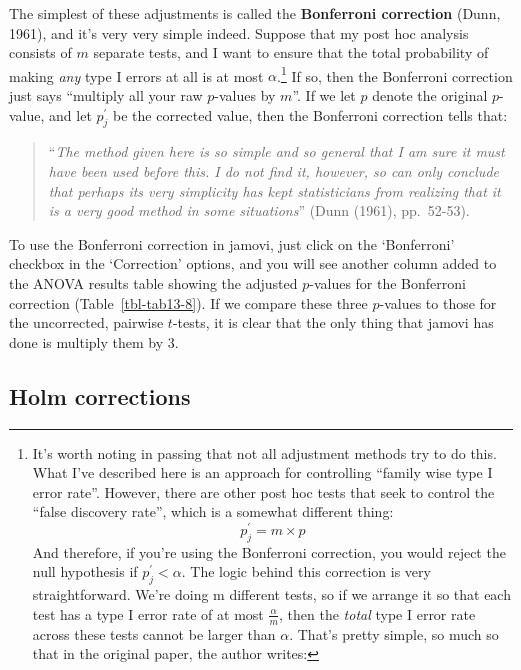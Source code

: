 \documentclass[
  a4paper,
]{book}
\begin{document}
The simplest of these adjustments is called the \textbf{Bonferroni
correction} (Dunn, 1961), and it's very very simple indeed. Suppose that
my post hoc analysis consists of \(m\) separate tests, and I want to
ensure that the total probability of making \emph{any} type I errors at
all is at most \(\alpha\).\footnote{It's worth noting in passing that
  not all adjustment methods try to do this. What I've described here is
  an approach for controlling ``family wise type I error rate''.
  However, there are other post hoc tests that seek to control the
  ``false discovery rate'', which is a somewhat different thing:
  \[p_j^{'}=m \times p\] And therefore, if you're using the Bonferroni
  correction, you would reject the null hypothesis if
  \(p_j^{'} < \alpha\). The logic behind this correction is very
  straightforward. We're doing m different tests, so if we arrange it so
  that each test has a type I error rate of at most
  \(\frac{\alpha}{m}\), then the \emph{total} type I error rate across
  these tests cannot be larger than \(\alpha\). That's pretty simple, so
  much so that in the original paper, the author writes:} If so, then
the Bonferroni correction just says ``multiply all your raw \(p\)-values
by \(m\)''. If we let \(p\) denote the original \(p\)-value, and let
\(p_j^{'}\) be the corrected value, then the Bonferroni correction tells
that:

\begin{quote}
``\emph{The method given here is so simple and so general that I am sure
it must have been used before this. I do not find it, however, so can
only conclude that perhaps its very simplicity has kept statisticians
from realizing that it is a very good method in some situations}'' (Dunn
(1961), pp.~52-53).
\end{quote}

To use the Bonferroni correction in jamovi, just click on the
`Bonferroni' checkbox in the `Correction' options, and you will see
another column added to the ANOVA results table showing the adjusted
\(p\)-values for the Bonferroni correction (Table~\ref{tbl-tab13-8}). If
we compare these three \(p\)-values to those for the uncorrected,
pairwise \(t\)-tests, it is clear that the only thing that jamovi has
done is multiply them by \(3\).

\hypertarget{holm-corrections}{%
\subsection{Holm corrections}\label{holm-corrections}}
\end{document}
